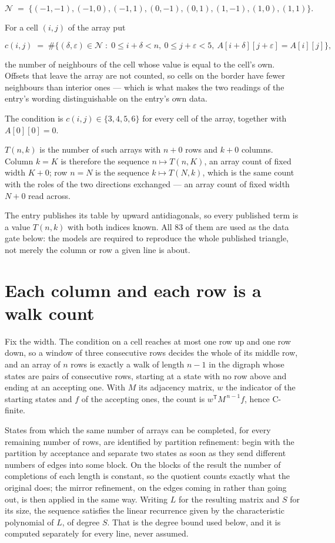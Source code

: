 \documentclass[11pt]{article}
\theoremstyle{definition}
\begin{document}
\[\mathcal{N} \;=\; \{(-1,-1), (-1,0), (-1,1), (0,-1), (0,1), (1,-1), (1,0), (1,1)\}.\]

For a cell $(i,j)$ of the array put

\[c(i,j) \;=\; \#\bigl\{(\delta,\varepsilon)\in\mathcal{N} \;:\; 0\le i+\delta<n,\ 0\le j+\varepsilon<5,\ A[i+\delta][j+\varepsilon] = A[i][j]\bigr\},\]

the number of neighbours of the cell whose value is equal to the cell's own. Offsets that leave the array are not counted, so cells on the border have fewer neighbours than interior ones --- which is what makes the two readings of the entry's wording distinguishable on the entry's own data.

The condition is $c(i,j) \in \{3, 4, 5, 6\}$ for every cell of the array, together with $A[0][0]=0$.

$T(n,k)$ is the number of such arrays with $n + 0$ rows and $k + 0$ columns. Column $k = K$ is therefore the sequence $n \mapsto T(n,K)$, an array count of fixed width $K + 0$; row $n = N$ is the sequence $k \mapsto T(N,k)$, which is the same count with the roles of the two directions exchanged --- an array count of fixed width $N + 0$ read across.

The entry publishes its table by upward antidiagonals, so every published term is a value $T(n,k)$ with both indices known. All 83 of them are used as the data gate below: the models are required to reproduce the whole published triangle, not merely the column or row a given line is about.

\section{Each column and each row is a walk count}

Fix the width. The condition on a cell reaches at most one row up and one row down, so a window of three consecutive rows decides the whole of its middle row, and an array of $n$ rows is exactly a walk of length $n-1$ in the digraph whose states are pairs of consecutive rows, starting at a state with no row above and ending at an accepting one. With $M$ its adjacency matrix, $w$ the indicator of the starting states and $f$ of the accepting ones, the count is $w^{\mathsf T}M^{\,n-1}f$, hence C-finite.

States from which the same number of arrays can be completed, for every remaining number of rows, are identified by partition refinement: begin with the partition by acceptance and separate two states as soon as they send different numbers of edges into some block. On the blocks of the result the number of completions of each length is constant, so the quotient counts exactly what the original does; the mirror refinement, on the edges coming in rather than going out, is then applied in the same way. Writing $L$ for the resulting matrix and $S$ for its size, the sequence satisfies the linear recurrence given by the characteristic polynomial of $L$, of degree $S$. That is the degree bound used below, and it is computed separately for every line, never assumed.
\end{document}
